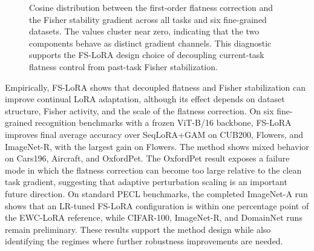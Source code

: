 \begin{figure}[t]
\centering
\fbox{\rule[-.5cm]{0cm}{4cm} \rule[-.5cm]{8cm}{0cm}}
\caption{
Cosine distribution between the first-order flatness correction and the Fisher stability gradient across all tasks and six fine-grained datasets.
The values cluster near zero, indicating that the two components behave as distinct gradient channels.
This diagnostic supports the FS-LoRA design choice of decoupling current-task flatness control from past-task Fisher stabilization.
}
\label{fig:cosine_histogram}
\end{figure}

Empirically, FS-LoRA shows that decoupled flatness and Fisher stabilization can improve continual LoRA adaptation, although its effect depends on dataset structure, Fisher activity, and the scale of the flatness correction.
On six fine-grained recognition benchmarks with a frozen ViT-B/16 backbone, FS-LoRA improves final average accuracy over SeqLoRA+GAM on CUB200, Flowers, and ImageNet-R, with the largest gain on Flowers.
The method shows mixed behavior on Cars196, Aircraft, and OxfordPet.
The OxfordPet result exposes a failure mode in which the flatness correction can become too large relative to the clean task gradient, suggesting that adaptive perturbation scaling is an important future direction.
On standard PECL benchmarks, the completed ImageNet-A run shows that an LR-tuned FS-LoRA configuration is within one percentage point of the EWC-LoRA reference, while CIFAR-100, ImageNet-R, and DomainNet runs remain preliminary.
These results support the method design while also identifying the regimes where further robustness improvements are needed.

